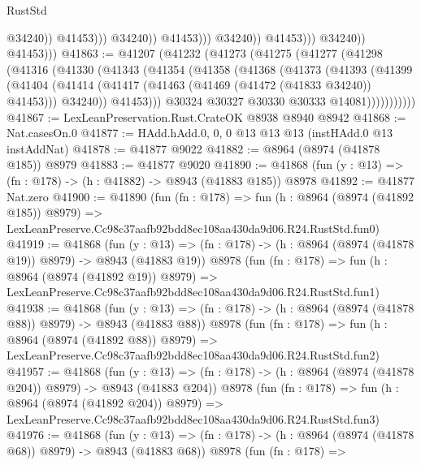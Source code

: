 \begin{lexlean}{RustStd}
\begin{coremodule}
                                            @34240))
                                        @41453)))
                                  @34240))
                              @41453)))
                        @34240))
                    @41453)))
              @34240))
          @41453)))
@41863 := @41207
    (@41232
      (@41273
        (@41275
          (@41277
            (@41298
              (@41316
                (@41330
                  (@41343
                    (@41354
                      (@41358
                        (@41368
                          (@41373
                            (@41393
                              (@41399
                                (@41404
                                  (@41414
                                    (@41417 (@41463 (@41469 (@41472 (@41833 @34240)) @41453)))
                                    @34240))
                                @41453)))
                          @30324
                          @30327
                          @30330
                          @30333
                          @14081)))))))))))
@41867 := LexLeanPreservation.Rust.CrateOK @8938 @8940 @8942
@41868 := Nat.casesOn.{0}
@41877 := HAdd.hAdd.{0, 0, 0} @13 @13 @13 (instHAdd.{0} @13 instAddNat)
@41878 := @41877 @9022
@41882 := @8964 (@8974 (@41878 @185)) @8979
@41883 := @41877 @9020
@41890 := @41868 (fun (y : @13) => (fn : @178) -> (h : @41882) -> @8943 (@41883 @185)) @8978
@41892 := @41877 Nat.zero
@41900 := @41890
    (fun (fn : @178) =>
    fun (h : @8964 (@8974 (@41892 @185)) @8979) =>
    LexLeanPreserve.Cc98c37aafb92bdd8ec108aa430da9d06.R24.RustStd.fun0)
@41919 := @41868
    (fun (y : @13) => (fn : @178) -> (h : @8964 (@8974 (@41878 @19)) @8979) -> @8943 (@41883 @19))
    @8978
    (fun (fn : @178) =>
    fun (h : @8964 (@8974 (@41892 @19)) @8979) =>
    LexLeanPreserve.Cc98c37aafb92bdd8ec108aa430da9d06.R24.RustStd.fun1)
@41938 := @41868
    (fun (y : @13) => (fn : @178) -> (h : @8964 (@8974 (@41878 @88)) @8979) -> @8943 (@41883 @88))
    @8978
    (fun (fn : @178) =>
    fun (h : @8964 (@8974 (@41892 @88)) @8979) =>
    LexLeanPreserve.Cc98c37aafb92bdd8ec108aa430da9d06.R24.RustStd.fun2)
@41957 := @41868
    (fun (y : @13) => (fn : @178) -> (h : @8964 (@8974 (@41878 @204)) @8979) -> @8943 (@41883 @204))
    @8978
    (fun (fn : @178) =>
    fun (h : @8964 (@8974 (@41892 @204)) @8979) =>
    LexLeanPreserve.Cc98c37aafb92bdd8ec108aa430da9d06.R24.RustStd.fun3)
@41976 := @41868
    (fun (y : @13) => (fn : @178) -> (h : @8964 (@8974 (@41878 @68)) @8979) -> @8943 (@41883 @68))
    @8978
    (fun (fn : @178) =>

\end{coremodule}
\end{lexlean}
